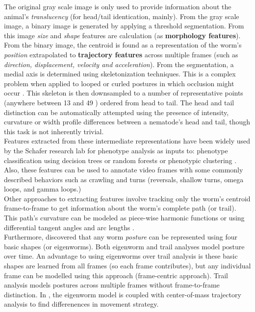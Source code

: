 \documentclass[main.tex]{subfiles}
\begin{document}
The original gray scale image is only used to provide information about the animal's \textit{translucency} (for head/tail identication, mainly). From the gray scale image, a binary image is generated by applying a threshold segmentation. From this image \textit{size} and \textit{shape} features are calculation (as \textbf{morphology features}). From the binary image, the centroid is found as a representation of the worm's \textit{position} extrapolated to \textbf{trajectory features} across multiple frames (such as \textit{direction, displacement, velocity and acceleration}). From the segmentation, a medial axis is determined using skeletonization techniques. This is a complex problem when applied to looped or curled postures in which occlusion might occur \cite{huang2006}. This skeleton is then downsampled to a number of representative points (anywhere between 13 \cite{cronin2005} and 49 \cite{yemini2013}) ordered from head to tail. The head and tail distinction can be automatically attempted using the presence of intensity, curvature or width profile differences between a nematode's head and tail, though this task is not inherently trivial.\\

Features extracted from these intermediate representations have been widely used by the Schafer research lab for phenotype analysis as inputs to: phenotype classification using decision trees \cite{baek2002} or random forests \cite{geng2004} or phenotypic clustering \cite{geng2003}. Also, these features can be used to annotate video frames with some commonly described behaviors such as crawling and turns (reversals, shallow turns, omega loops, and gamma loops.)\\

Other approaches to extracting features involve tracking only the worm's centroid frame-to-frame to get information about the worm's complete path (or trail). This path's curvature can be modeled as piece-wise harmonic functions \cite{padmanabhan2012} or using differential tangent angles and arc lengths \cite{kim2011}. \\

Furthermore, \cite{stephens2008} discovered that any worm \textit{posture} can be represented using four basic shapes (or eigenworms). Both eigenworm and trail analyses model posture over time. An advantage to using eigenworms over trail analysis is these basic shapes are learned from all frames (so each frame contributes), but any individual frame can be modelled using this approach (frame-centric approach). Trail analysis models postures across multiple frames without frame-to-frame distinction. In \cite{stephens2010}, the eigenworm model is coupled with center-of-mass trajectory analysis to find differenences in movement strategy. \\
\end{document}
